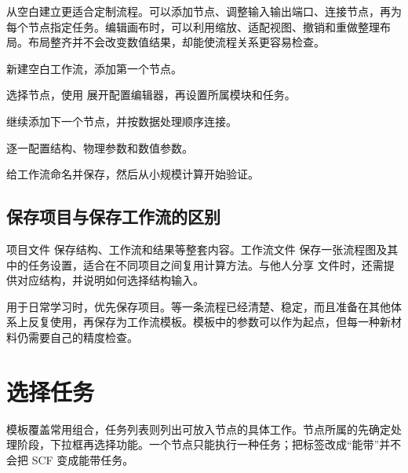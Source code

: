 从空白建立更适合定制流程。可以添加节点、调整输入输出端口、连接节点，再为每个节点指定任务。编辑画布时，可以利用缩放、适配视图、撤销和重做整理布局。布局整齐并不会改变数值结果，却能使流程关系更容易检查。

\begin{steps}
\item 新建空白工作流，添加第一个节点。
\item 选择节点，使用  展开配置编辑器，再设置所属模块和任务。
\item 继续添加下一个节点，并按数据处理顺序连接。
\item 逐一配置结构、物理参数和数值参数。
\item 给工作流命名并保存，然后从小规模计算开始验证。
\end{steps}

\subsection{保存项目与保存工作流的区别}

项目文件  保存结构、工作流和结果等整套内容。工作流文件  保存一张流程图及其中的任务设置，适合在不同项目之间复用计算方法。与他人分享  文件时，还需提供对应结构，并说明如何选择结构输入。

用于日常学习时，优先保存项目。等一条流程已经清楚、稳定，而且准备在其他体系上反复使用，再保存为工作流模板。模板中的参数可以作为起点，但每一种新材料仍需要自己的精度检查。


\section{选择任务}\label{sec:task-catalog}

模板覆盖常用组合，任务列表则列出可放入节点的具体工作。节点所属的先确定处理阶段，下拉框再选择功能。一个节点只能执行一种任务；把标签改成“能带”并不会把 SCF 变成能带任务。

